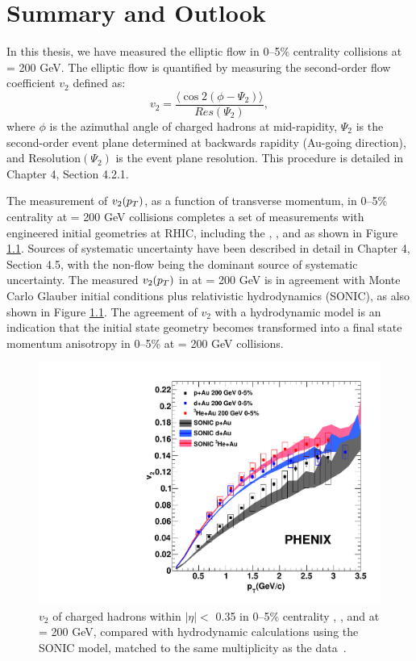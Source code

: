 \chapter{Summary and Outlook}
In this thesis, we have measured the elliptic flow in 0--5\% centrality \pau collisions at \sqsn = 200 GeV. The elliptic flow is quantified by measuring the second-order flow coefficient $v_2$ defined as:
\begin{equation}
v_2 = \frac{\langle\cos 2(\phi-\Psi_2) \rangle}{ Res(\Psi_2)},
\end{equation}
where $\phi$ is the azimuthal angle of charged hadrons at mid-rapidity, $\Psi_2$ is the second-order event plane determined at backwards rapidity (Au-going direction), and Resolution$(\Psi_2)$ is the event plane resolution. This procedure is detailed in Chapter 4, Section 4.2.1.

The measurement of $v_2(\mbox{$p_T$})$, as a function of transverse momentum, in 0--5\% centrality \pau at \sqsn = 200 GeV collisions completes a set of measurements with engineered initial geometries at RHIC, including the \pau, \dau, and \hau as shown in Figure \ref{fig:all_system_hydro_6}. Sources of systematic uncertainty have been described in detail in Chapter 4, Section 4.5, with the non-flow being the dominant source of systematic uncertainty. The measured $v_2(\mbox{$p_T$})$ in \pau at \sqsn = 200 GeV is in agreement with Monte Carlo Glauber initial conditions plus relativistic hydrodynamics (SONIC), as also shown in Figure \ref{fig:all_system_hydro_6}. The agreement of $v_2$ with a hydrodynamic model is an indication that the initial state geometry becomes transformed into a final state momentum anisotropy in 0--5\% \pau at \sqsn = 200 GeV collisions. 

\begin{figure}[!ht]
\begin{center}
\includegraphics[width=0.5\linewidth]{figs/three_system_comparison_result.pdf}
\caption{$v_2$ of charged hadrons within $|\eta| <$ 0.35 in 0--5\% centrality \pau, \dau, and \hau at \sqsn = 200 GeV, compared with hydrodynamic calculations using the SONIC model, matched to the same multiplicity as the data~\cite{Habich:2014jna}.}
\label{fig:all_system_hydro_6}
\end{center}
\end{figure}

